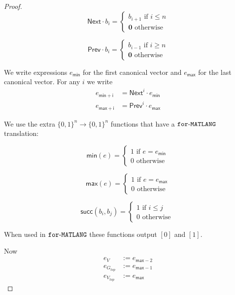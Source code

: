 \begin{proof}
    \[
                \mathsf{Next}\cdot b_i=\begin{cases}
                b_{i+1} \text{ if } i\leq n \\
                \mathbf{0} \text{ otherwise }
                \end{cases}
    \]

    \[
                \mathsf{Prev}\cdot b_i=\begin{cases}
                b_{i-1} \text{ if } i\geq n \\
                \mathbf{0} \text{ otherwise }
                \end{cases}
    \]

    We write expressions $e_{\mathsf{min}}$ for the first canonical vector and $e_{\mathsf{max}}$ for the last canonical vector. For any $i$ we write 
    \begin{align*}
        e_{\mathsf{min}+\mathsf{i}} &= \mathsf{Next}^i\cdot e_{\mathsf{min}} \\
        e_{\mathsf{max}+\mathsf{i}} &= \mathsf{Prev}^i\cdot e_{\mathsf{max}}
    \end{align*}

    We use the extra $\lbrace 0,1 \rbrace^n\rightarrow\lbrace 0,1 \rbrace^n$ functions that have a $\texttt{for}\text{-}\texttt{MATLANG}$ translation:

    \[
                \mathsf{min}(e)=\begin{cases}
                1 \text{ if } e=e_{\mathsf{min}} \\
                0 \text{ otherwise }
                \end{cases}
    \]

    \[
                \mathsf{max}(e)=\begin{cases}
                1 \text{ if } e=e_{\mathsf{max}} \\
                0 \text{ otherwise }
                \end{cases}
    \]

    \[
                \mathsf{succ}(b_i,b_j)=\begin{cases}
                1 \text{ if } i\leq j \\
                0 \text{ otherwise }
                \end{cases}
    \]

    When used in $\texttt{for}\text{-}\texttt{MATLANG}$ these functions output $[0]$ and $[1]$.

    Now 
    \begin{align*}
        e_{V}&:=e_{\mathsf{max}-2} \\
        e_{G_{top}}&:=e_{\mathsf{max}-1} \\
        e_{V_{top}}&:=e_{\mathsf{max}}
    \end{align*}


\end{proof}
